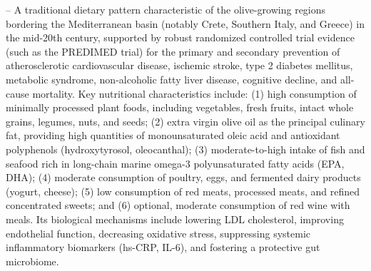 -- A traditional dietary pattern characteristic of the olive-growing regions bordering the Mediterranean basin (notably Crete, Southern Italy, and Greece) in the mid-20th century, supported by robust randomized controlled trial evidence (such as the PREDIMED trial) for the primary and secondary prevention of atherosclerotic cardiovascular disease, ischemic stroke, type 2 diabetes mellitus, metabolic syndrome, non-alcoholic fatty liver disease, cognitive decline, and all-cause mortality. Key nutritional characteristics include: (1) high consumption of minimally processed plant foods, including vegetables, fresh fruits, intact whole grains, legumes, nuts, and seeds; (2) extra virgin olive oil as the principal culinary fat, providing high quantities of monounsaturated oleic acid and antioxidant polyphenols (hydroxytyrosol, oleocanthal); (3) moderate-to-high intake of fish and seafood rich in long-chain marine omega-3 polyunsaturated fatty acids (EPA, DHA); (4) moderate consumption of poultry, eggs, and fermented dairy products (yogurt, cheese); (5) low consumption of red meats, processed meats, and refined concentrated sweets; and (6) optional, moderate consumption of red wine with meals. Its biological mechanisms include lowering LDL cholesterol, improving endothelial function, decreasing oxidative stress, suppressing systemic inflammatory biomarkers (hs-CRP, IL-6), and fostering a protective gut microbiome.

